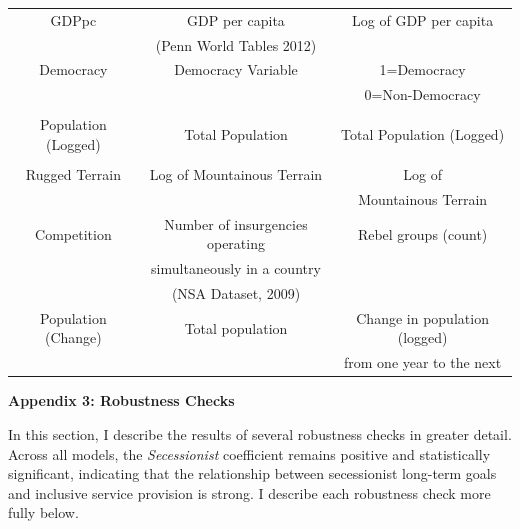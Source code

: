 \documentclass[12pt, letterpaper]{article}
\begin{document}
\begin{table}[h]
\begin{tabular}{| c | c | c |}
GDPpc&       GDP per capita              & Log of GDP per capita\\       
 &        (Penn World Tables 2012)          &  \\   \hline
 Democracy &           Democracy Variable         & 1=Democracy\\   
 &         \citep{cheibub2010democracy}           & 0=Non-Democracy   \\   
 &                  & \\          \hline     
Population (Logged) &       Total Population                & Total Population (Logged) \\  
&      \citep{heston2002penn}              & \\        \hline
Rugged Terrain &      Log of Mountainous Terrain             & Log of  \\   
 &       \citep{fearon2003ethnicity}          & Mountainous Terrain \\         \hline  
 Competition &       Number of insurgencies operating        & Rebel groups (count) \\  
&       simultaneously in a country            & \\        
&       (NSA Dataset, 2009)            & \\        \hline
 Population (Change) &         Total population              & Change in population (logged) \\  
&       \citep{heston2002penn}                 & from one year to the next \\        \hline

 \hline
    \hline
    \end{tabular}
\end{table}



\newpage
\clearpage
\begin{center}
\Large{\textbf{Appendix 3: Robustness Checks}}
\end{center}

In this section, I describe the results of several robustness checks in greater detail. Across all models, the \textit{Secessionist} coefficient remains positive and statistically significant, indicating that the relationship between secessionist long-term goals and inclusive service provision is strong. I describe each robustness check more fully below. 
\end{document}
